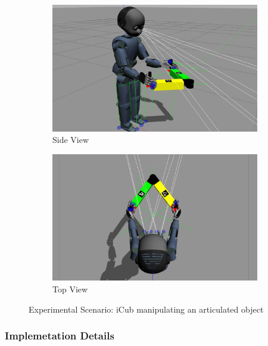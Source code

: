 \documentclass[12pt,a4paper]{report}
\begin{document}
\begin{figure}[H]
	\begin{subfigure}[b]{0.5\textwidth}
		\centering
		\includegraphics[scale=0.22]{figures/icub_object_side.jpg}
		\caption{Side View}
		\label{icub_object_side_view}
	\end{subfigure}
	\begin{subfigure}[b]{0.5\textwidth}
		\centering
		\includegraphics[scale=0.22]{figures/icub_object_top.jpg}
		\caption{Top View}
		\label{icub_object_top_view}
	\end{subfigure}
	\caption{Experimental Scenario: iCub manipulating an articulated object}
	\label{icub_object}
\end{figure}

\subsubsection{Implemetation Details}
\end{document}
